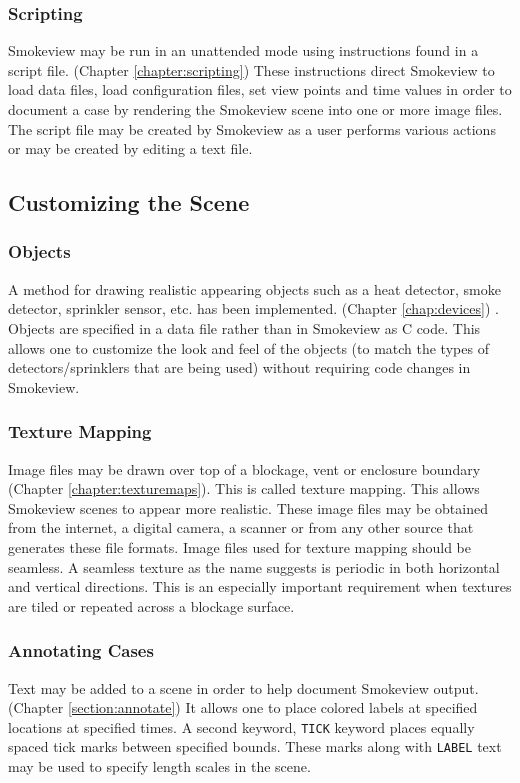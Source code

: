 \documentclass[11pt,twoside]{book}
\begin{document}
\subsubsection{Scripting} Smokeview may be run in an unattended mode using
instructions found in a script file. (Chapter
\ref{chapter:scripting}) These instructions direct Smokeview to
load data files, load configuration files, set view points and
time values in order to document a case by rendering the Smokeview
scene into one or more image files. The script file may be created
by Smokeview as a user performs various actions or may be created
by editing a text file.

\subsection{Customizing the Scene}

\subsubsection{Objects}A method for drawing realistic appearing objects such as a heat detector,
smoke detector, sprinkler sensor, etc. has been implemented.
(Chapter \ref{chap:devices}) . Objects are specified in a data
file rather than in Smokeview as C code. This allows one to
customize the look and feel of the objects (to match the types of
detectors/sprinklers that are being used) without requiring code
changes in Smokeview.

\subsubsection{Texture Mapping} Image files may be drawn over top
of a blockage, vent or enclosure boundary (Chapter
\ref{chapter:texturemaps}). This is called texture mapping.  This
allows Smokeview scenes to appear more realistic. These image
files may be obtained from the internet, a digital camera, a
scanner or from any other source that generates these file
formats. Image files used for texture mapping should be seamless.
A seamless texture as the name suggests is periodic in both
horizontal and vertical directions. This is an especially
important requirement when textures are tiled or repeated across a
blockage surface.

\subsubsection{Annotating Cases}Text may be added to a scene in order to help document Smokeview
output. (Chapter \ref{section:annotate}) It allows one to place
colored labels at specified locations at specified times. A second
keyword, {\tt TICK} keyword places equally spaced tick marks
between specified bounds. These marks along with {\tt LABEL} text
may be used to specify length scales in the scene.
\end{document}
